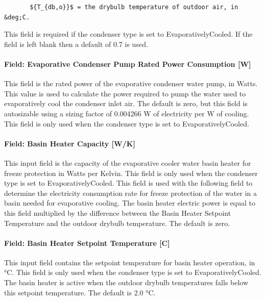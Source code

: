 \begin{lstlisting}
       ${T_{db,o}}$ = the drybulb temperature of outdoor air, in  &deg;C.
\end{lstlisting}

This field is required if the condenser type is set to EvaporativelyCooled. If the field is left blank then a default of 0.7 is used.

\paragraph{Field: Evaporative Condenser Pump Rated Power Consumption {[}W{]}}\label{field-evaporative-condenser-pump-rated-power-consumption-w}

This field is the rated power of the evaporative condenser water pump, in Watts. This value is used to calculate the power required to pump the water used to evaporatively cool the condenser inlet air. The default is zero, but this field is autosizable using a sizing factor of 0.004266 W of electricity per W of cooling. This field is only used when the condenser type is set to EvaporativelyCooled.

\paragraph{Field: Basin Heater Capacity {[}W/K{]}}\label{field-basin-heater-capacity-wk}

This input field is the capacity of the evaporative cooler water basin heater for freeze protection in Watts per Kelvin. This field is only used when the condenser type is set to EvaporativelyCooled. This field is used with the following field to determine the electricity consumption rate for freeze protection of the water in a basin needed for evaporative cooling. The basin heater electric power is equal to this field multiplied by the difference between the Basin Heater Setpoint Temperature and the outdoor drybulb temperature. The default is zero.

\paragraph{Field: Basin Heater Setpoint Temperature {[}C{]}}\label{field-basin-heater-setpoint-temperature-c}

This input field contains the setpoint temperature for basin heater operation, in °C. This field is only used when the condenser type is set to EvaporativelyCooled. The basin heater is active when the outdoor drybulb temperatures falls below this setpoint temperature. The default is 2.0 °C.

